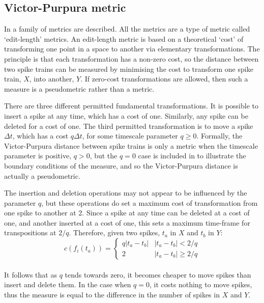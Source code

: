 \subsection{Victor-Purpura metric}

In \citep{VictorPurpura1997a} a family of metrics are described.  All the metrics are a type of metric called \lq{}edit-length\rq{} metrics. An edit-length metric is based on a theoretical \lq{}cost\rq{} of transforming one point in a space to another via elementary transformations.  The principle is that each transformation has a non-zero cost, so the distance between two spike trains can be measured by minimising  the cost to transform one spike train, $X$, into another, $Y$. If zero-cost transformations are allowed, then such a measure is a pseudometric rather than a metric.

There are three different permitted fundamental transformations.  It is possible to insert a spike at any time, which has a cost of one.  Similarly, any spike can be deleted for a cost of one.  The third permitted transformation is to move a spike $\Delta t$, which has a cost $q\Delta t$, for some timescale parameter $q\geq0$.  Formally, the Victor-Purpura distance between spike trains is only a metric when the timescale parameter is positive, $q>0$, but the $q=0$ case is included in \citep{VictorPurpura1997a} to illustrate the boundary conditions of the measure, and so the Victor-Purpura distance is actually a pseudometric.

The insertion and deletion operations may not appear to be influenced by the parameter $q$, but these operations do set a maximum cost of transformation from one spike to another at $2$.  Since a spike at any time can be deleted at a cost of one, and another inserted at a cost of one, this sets a maximum time-frame for transpositions at $2/q$.  Therefore, given two spikes, $t_a$ in $X$ and $t_b$ in $Y$:
\begin{equation}
c(f_i(t_a)) = \left\{ \begin{array}{ll} q | t_a - t_b | & | t_a - t_b | < 2/q \\ 2 & | t_a - t_b | \geq  2/q \end{array}\right.
\end{equation}\\
It follows that as $q$ tends towards zero, it becomes cheaper to move spikes than insert and delete them.  In the case when $q=0$, it costs nothing to move spikes, thus the measure is equal to the difference in the number of spikes in $X$ and $Y$.


